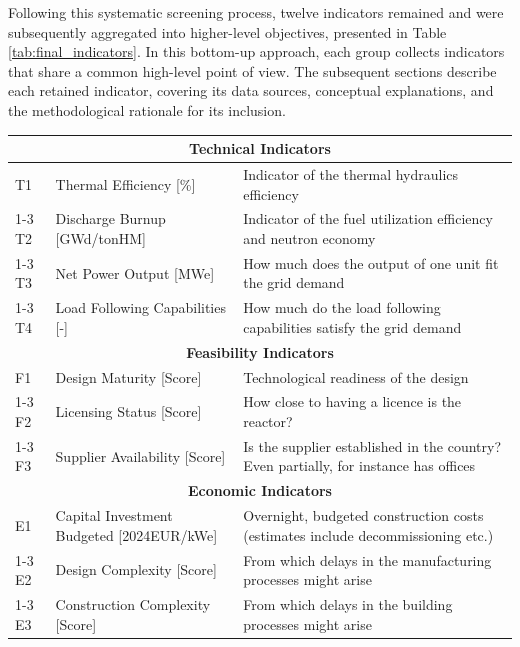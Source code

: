 Following this systematic screening process, twelve indicators remained and were subsequently aggregated into higher-level objectives, presented in Table \ref{tab:final_indicators}. In this bottom-up approach, each group collects indicators that share a common high-level point of view. The subsequent sections describe each retained indicator, covering its data sources, conceptual explanations, and the methodological rationale for its inclusion.

\begin{table}[!hb]
    \centering
    \begin{tabularx}{\textwidth}{lXX}
        \toprule
        \multicolumn{3}{c}{\textbf{Technical Indicators}} \\
        \midrule
        T1 & Thermal Efficiency [\%] & Indicator of the thermal hydraulics efficiency \\
        \cmidrule(lr){1-3}
        T2 & Discharge Burnup [GWd/tonHM] & Indicator of the fuel utilization efficiency and neutron economy \\
        \cmidrule(lr){1-3}
        T3 & Net Power Output [MWe] & How much does the output of one unit fit the grid demand \\
        \cmidrule(lr){1-3}
        T4 & Load Following Capabilities [-] & How much do the load following capabilities satisfy the grid demand \\
        \midrule
        \multicolumn{3}{c}{\textbf{Feasibility Indicators}} \\
        \midrule
        F1 & Design Maturity [Score] & Technological readiness of the design \\
        \cmidrule(lr){1-3}
        F2 & Licensing Status [Score] & How close to having a licence is the reactor? \\
        \cmidrule(lr){1-3}
        F3 & Supplier Availability [Score] & Is the supplier established in the country? Even partially, for instance has offices \\
        \midrule
        \multicolumn{3}{c}{\textbf{Economic Indicators}} \\
        \midrule
        E1 & Capital Investment Budgeted [2024EUR/kWe] & Overnight, budgeted construction costs (estimates include decommissioning etc.) \\
        \cmidrule(lr){1-3}
        E2 & Design Complexity [Score] & From which delays in the manufacturing processes might arise \\
        \cmidrule(lr){1-3}
        E3 & Construction Complexity [Score] & From which delays in the building processes might arise \\

\end{tabularx}
\end{table}

